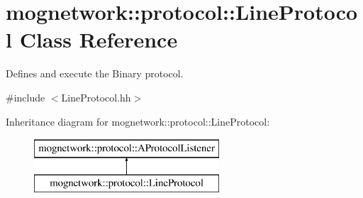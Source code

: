 \hypertarget{classmognetwork_1_1protocol_1_1_line_protocol}{\section{mognetwork\-:\-:protocol\-:\-:Line\-Protocol Class Reference}
\label{classmognetwork_1_1protocol_1_1_line_protocol}
}


Defines and execute the Binary protocol.  




{\ttfamily \#include $<$Line\-Protocol.\-hh$>$}

Inheritance diagram for mognetwork\-:\-:protocol\-:\-:Line\-Protocol\-:\begin{figure}[H]
\begin{center}
\leavevmode
\includegraphics[height=2.000000cm]{classmognetwork_1_1protocol_1_1_line_protocol}
\end{center}
\end{figure}
